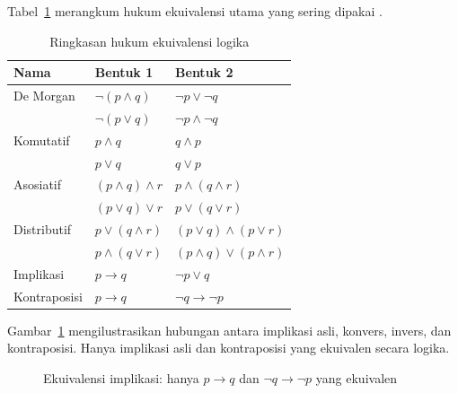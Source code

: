 Tabel~\ref{tab:hukum-ekuivalensi} merangkum hukum ekuivalensi utama yang sering dipakai \cite{libretexts_equiv,rosen2019}.

\begin{table}[htbp]
\centering
\small
\begin{tabular}{|l|>{\raggedright\arraybackslash}p{5.2cm}|>{\raggedright\arraybackslash}p{5.2cm}|}
\hline
\textbf{Nama} & \textbf{Bentuk 1} & \textbf{Bentuk 2} \\
\hline
De Morgan & $\neg(p \wedge q)$ & $\neg p \vee \neg q$ \\
& $\neg(p \vee q)$ & $\neg p \wedge \neg q$ \\
\hline
Komutatif & $p \wedge q$ & $q \wedge p$ \\
& $p \vee q$ & $q \vee p$ \\
\hline
Asosiatif & $(p \wedge q) \wedge r$ & $p \wedge (q \wedge r)$ \\
& $(p \vee q) \vee r$ & $p \vee (q \vee r)$ \\
\hline
Distributif & $p \vee (q \wedge r)$ & $(p \vee q) \wedge (p \vee r)$ \\
& $p \wedge (q \vee r)$ & $(p \wedge q) \vee (p \wedge r)$ \\
\hline
Implikasi & $p \rightarrow q$ & $\neg p \vee q$ \\
\hline
Kontraposisi & $p \rightarrow q$ & $\neg q \rightarrow \neg p$ \\
\hline
\end{tabular}
\caption{Ringkasan hukum ekuivalensi logika \cite{libretexts_equiv}}
\label{tab:hukum-ekuivalensi}
\end{table}

Gambar~\ref{fig:ekuivalensi-implikasi} mengilustrasikan hubungan antara implikasi asli, konvers, invers, dan kontraposisi. Hanya implikasi asli dan kontraposisi yang ekuivalen secara logika.

\begin{figure}[htbp]
\centering
{}
\caption{Ekuivalensi implikasi: hanya $p \rightarrow q$ dan $\neg q \rightarrow \neg p$ yang ekuivalen \cite{copi2014}}
\label{fig:ekuivalensi-implikasi}
\end{figure}

